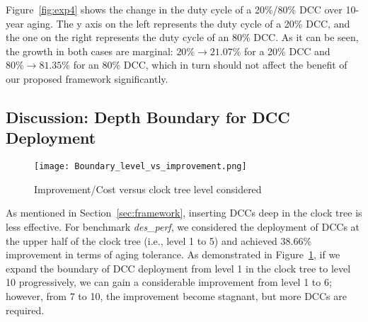 Figure~\ref{fig:exp4} shows the change in the duty cycle of a 20\%/80\% DCC over 10-year aging. The y axis on the left represents the duty cycle of a 20\% DCC, and the one on the right represents the duty cycle of an 80\% DCC. As it can be seen, the growth in both cases are marginal: $20\% \to 21.07\%$ for a 20\% DCC and $80\% \to 81.35\%$ for an 80\% DCC, which in turn should not affect the benefit of our proposed framework significantly.


\subsection{Discussion: Depth Boundary for DCC Deployment}
\begin{figure}
    \centering
    \texttt{[image: Boundary\_level\_vs\_improvement.png]} %
    \caption{Improvement/Cost versus clock tree level considered}
    \label{fig:boundary}
\end{figure}

As mentioned in Section~\ref{sec:framework}, inserting DCCs deep in the clock tree is less effective. For benchmark \textit{des\_perf}, we considered the deployment of DCCs at the upper half of the clock tree (i.e., level 1 to 5) and achieved 38.66\% improvement in terms of aging tolerance. As demonstrated in Figure~\ref{fig:boundary}, if we expand the boundary of DCC deployment from level 1 in the clock tree to level 10 progressively, we can gain a considerable improvement from level 1 to 6; however, from 7 to 10, the improvement become stagnant, but more DCCs are required.